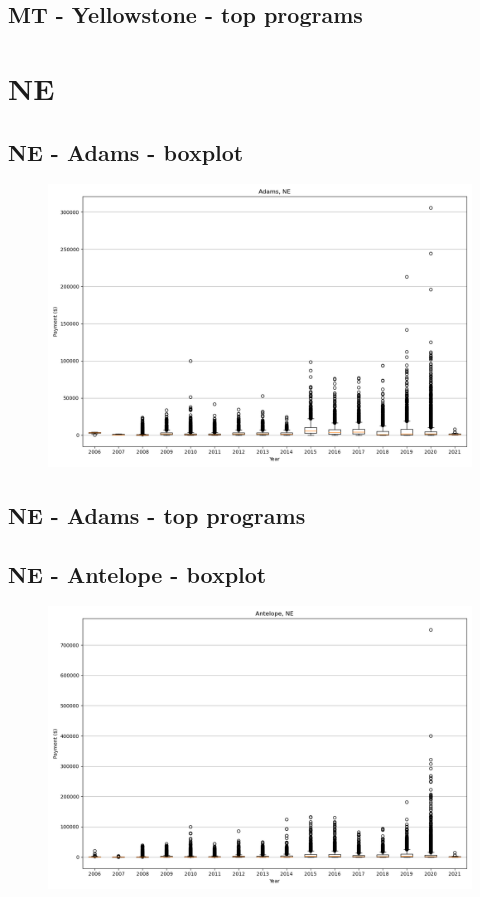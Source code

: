 \subsection*{MT - Yellowstone - top programs}

\newpage
\section*{NE}
\subsection*{NE - Adams - boxplot}
\begin{figure}[h]
\centering
\includegraphics[width=7in]{../output/boxplots/counties/Adams-NE_boxplot.png}
\end{figure}


\subsection*{NE - Adams - top programs}

\newpage
\subsection*{NE - Antelope - boxplot}
\begin{figure}[h]
\centering
\includegraphics[width=7in]{../output/boxplots/counties/Antelope-NE_boxplot.png}
\end{figure}


